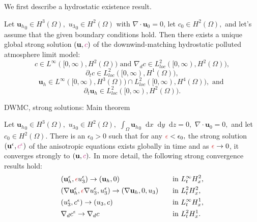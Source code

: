 \documentclass{beamer}
\newcommand*\diff{\mathop{}\!\mathrm{d}}
\begin{document}
\begin{frame}
\vspace{-0.5cm}
We first describe a hydrostatic existence result.

\begin{theorem}
Let ${\mathbf{u}_h}_0 \in H^3(\Omega),$ ${u_3}_0 \in H^2(\Omega)$ with $\nabla \cdot \mathbf{u}_0 = 0$, let $c_0 \in H^2 (\Omega),$ and let's assume that the given boundary conditions hold. Then there exists a unique global strong solution $(\mathbf{u}, \textcolor{mediumred-violet}{c})$ of the downwind-matching hydrostatic polluted atmosphere limit model:
%
    \begin{equation} \nonumber
      c \in L^\infty([0, \infty), H^2(\Omega)) \text{ and } \nabla_d c \in L^2_{loc}([0, \infty), H^2(\Omega)),
    \end{equation}
%
    \begin{equation} \nonumber
      \partial_t c \in L^2_{loc}([0, \infty), H^1(\Omega)),
    \end{equation}
%
    \begin{equation} \nonumber
      \mathbf{u}_h \in L^\infty([0, \infty), H^3(\Omega)) \cap L^2_{loc}([0, \infty), H^4(\Omega)), \text{ and }
    \end{equation}
%
    \begin{equation} \nonumber
      \partial_t \mathbf{u}_h \in L^2_{loc}([0, \infty), H^2(\Omega)).
    \end{equation}
%
\end{theorem}

\end{frame}

\begin{frame}{DWMC, strong solutions: Main theorem}
\vspace{-0.7cm}
\begin{theorem}
Let ${\mathbf{u}_h}_0 \in H^3(\Omega),$ ${u_3}_0 \in H^2(\Omega),$ $\int_\Omega {\mathbf{u}_h}_0 \diff x \diff y \diff z = 0,$ $\nabla \cdot \mathbf{u}_0 = 0,$ and let $c_0 \in H^2 (\Omega).$ There is an $\epsilon_0 > 0$ such that for any $\textcolor{jasper}{\epsilon} < \epsilon_0,$ the strong solution $(\mathbf{u}^\epsilon, \textcolor{mediumred-violet}{c^\epsilon})$ of the anisotropic equations exists globally in time and as $\textcolor{jasper}{\epsilon} \to 0$, it converges strongly to $(\mathbf{u}, \textcolor{mediumred-violet}{c}).$ 
In more detail, the following strong convergence results hold:
\begin{align} 
& (\mathbf{u}_h^\epsilon, \textcolor{jasper}{\epsilon} u_3^\epsilon) \to (\mathbf{u}_h, 0) &\quad & \text{in $L_t^\infty H_x^2$,} \nonumber \\
& (\nabla \mathbf{u}_h^\epsilon, \textcolor{jasper}{\epsilon} \nabla u_3^\epsilon, u_3^\epsilon) \to (\nabla \mathbf{u}_h, 0, u_3) &\quad & \text{in $L_t^2 H_x^2$,} \nonumber \\ 
& (u_3^\epsilon, c^\epsilon) \to (u_3, c) &\quad & \text{in $L_t^\infty H_x^1,$} \nonumber \\
& \nabla_d c^\epsilon \to \nabla_d c &\quad & \text{in $L_t^2 H_x^1.$} \nonumber
\end{align}
\end{theorem}  
\end{frame}
\end{document}
